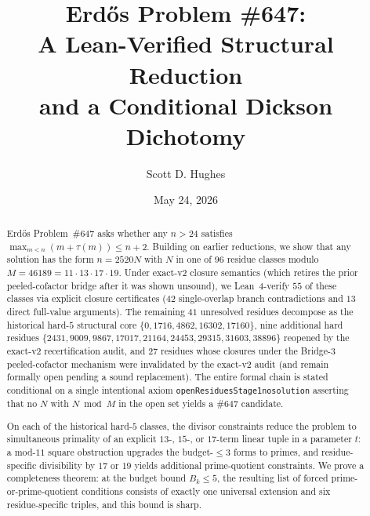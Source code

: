 \documentclass[11pt]{article}
\title{Erd\H{o}s Problem \#647:\\
A Lean-Verified Structural Reduction\\
and a Conditional Dickson Dichotomy}
\author{Scott D. Hughes}
\date{May 24, 2026}
\renewcommand{\_}{\origunderscore\allowbreak}
\theoremstyle{definition}
\theoremstyle{remark}
\begin{document}
\maketitle

\begin{abstract}
Erd\H{o}s Problem~\#647 asks whether any $n>24$ satisfies
$\max_{m<n}(m+\tau(m))\le n+2$. Building on earlier reductions,
we show that any solution has the form $n=2520N$ with $N$ in one
of $96$ residue classes modulo $M=46189=11\cdot 13\cdot 17\cdot 19$.
Under exact-v2 closure semantics (which retires the prior peeled-cofactor
bridge after it was shown unsound), we Lean~4-verify $55$ of these
classes via explicit closure certificates ($42$ single-overlap branch
contradictions and $13$ direct full-value arguments). The remaining
$41$ unresolved residues decompose as the historical hard-$5$
structural core $\{0,1716,4862,16302,17160\}$, nine additional hard
residues $\{2431,9009,9867,17017,21164,24453,29315,31603,38896\}$
reopened by the exact-v2 recertification audit, and $27$ residues
whose closures under the Bridge-3 peeled-cofactor mechanism were
invalidated by the exact-v2 audit (and remain formally open pending
a sound replacement). The entire formal
chain is stated conditional on a single intentional axiom
\texttt{openResiduesStage1\_no\_solution} asserting that no $N$ with
$N\bmod M$ in the open set yields a \#647 candidate.

On each of the historical hard-$5$ classes, the divisor constraints
reduce the problem to simultaneous primality of an explicit
$13$-, $15$-, or $17$-term linear tuple in a parameter
$t$: a mod-$11$ square obstruction upgrades the budget-$\le 3$ forms
to primes, and residue-specific divisibility by $17$ or $19$ yields
additional prime-quotient constraints. We prove a completeness
theorem: at the budget bound $B_k\le 5$, the resulting list of
forced prime-or-prime-quotient conditions consists of exactly one
universal extension and six residue-specific triples, and this
bound is sharp.


\end{abstract}
\end{document}
